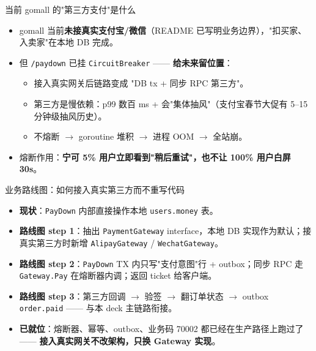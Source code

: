 \documentclass[aspectratio=169,11pt]{beamer}
\begin{document}
\begin{frame}[shrink]{当前 gomall 的"第三方支付"是什么}
\begin{itemize}
  \item gomall 当前\textbf{未接真实支付宝/微信}（README 已写明业务边界），"扣买家、入卖家"在本地 DB 完成。
  \item 但 \texttt{/paydown} 已挂 \texttt{CircuitBreaker} —— \textbf{给未来留位置}：
  \begin{itemize}
    \item 接入真实网关后链路变成 "DB tx + 同步 RPC 第三方"。
    \item 第三方是慢依赖：p99 数百 ms + 会"集体抽风"（支付宝春节大促有 5--15 分钟级抽风历史）。
    \item 不熔断 $\to$ goroutine 堆积 $\to$ 进程 OOM $\to$ 全站崩。
  \end{itemize}
  \item 熔断作用：\textbf{宁可 5\% 用户立即看到"稍后重试"，也不让 100\% 用户白屏 30s}。
\end{itemize}
\end{frame}

\begin{frame}[shrink]{业务路线图：如何接入真实第三方而不重写代码}
\begin{itemize}
  \item \textbf{现状}：\texttt{PayDown} 内部直接操作本地 \texttt{users.money} 表。
  \item \textbf{路线图 step 1}：抽出 \texttt{PaymentGateway} interface，本地 DB 实现作为默认；接真实第三方时新增 \texttt{AlipayGateway} / \texttt{WechatGateway}。
  \item \textbf{路线图 step 2}：\texttt{PayDown} TX 内只写"支付意图"行 + outbox；同步 RPC 走 \texttt{Gateway.Pay} 在熔断器内调；返回 ticket 给客户端。
  \item \textbf{路线图 step 3}：第三方回调 $\to$ 验签 $\to$ 翻订单状态 $\to$ outbox \texttt{order.paid} —— 与本 deck 主链路衔接。
  \item \textbf{已就位}：熔断器、幂等、outbox、业务码 70002 都已经在生产路径上跑过了 —— \textbf{接入真实网关不改架构，只换 Gateway 实现}。
\end{itemize}
\end{frame}
\end{document}

